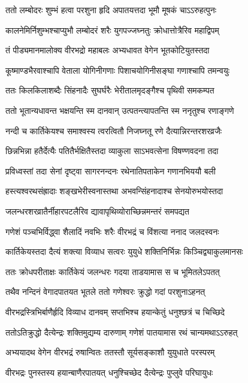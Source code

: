\twolineshloka
{ततो लम्बोदरः शुम्भं हत्वा परशुना हृदि}
{अपातयत्तदा भूमौ मूषकं चाऽऽरुहत्पुनः} %

\twolineshloka
{कालनेमिर्निशुम्भश्चाप्युभौ लम्बोदरं शरैः}
{युगपज्जघ्नतुः क्रोधात्तोत्रैरिव महाद्विपम्} %

\twolineshloka
{तं पीड्यमानमालोक्य वीरभद्रो महाबलः}
{अभ्यधावत वेगेन भूतकोटियुतस्तदा} %

\twolineshloka
{कूष्माण्डभैरवाश्चापि वेताला योगिनीगणाः}
{पिशाचयोगिनीसङ्घा गणाश्चापि तमन्वयुः} %

\twolineshloka
{ततः किलकिलाशब्दैः सिंहनादैः सुघर्घरैः}
{भेरीतालमृदङ्गैश्च पृथिवी समकम्पत} %

\twolineshloka
{ततो भूतान्यधावन्त भक्षयन्ति स्म दानवान्}
{उत्पतन्त्यापतन्ति स्म ननृतुश्च रणाङ्गणे} %

\twolineshloka
{नन्दी च कार्तिकेयश्च समाश्वस्य त्वरत्वितौ}
{निजघ्नतू रणे दैत्यान्निरन्तरशरव्रजैः} %

\twolineshloka
{छिन्नभिन्ना हतैर्देत्यैः पतितैर्भक्षितैस्तदा}
{व्याकुला साऽभवत्सेना विषण्णवदना तदा} %

\twolineshloka
{प्रविध्वस्तां तदा सेनां दृष्ट्वा सागरनन्दनः}
{रथेनातिपताकेन गणानभिययौ बली} %

\twolineshloka
{हस्त्यश्वरथसंह्रादाः शङ्खभेरीस्वनास्तथा}
{अभवन्सिंहनादाश्च सेनयोरुभयोस्तदा} %

\twolineshloka
{जलन्धरशरव्रातैर्नीहारपटलैरिव}
{द्यावापृथिव्योराच्छिन्नमन्तरं समपद्यत} %

\twolineshloka
{गणेशं पञ्चभिर्विद्ध्वा शैलादिं नवभिः शरैः}
{वीरभद्रं च विंशत्या ननाद जलदस्वनः} %

\twolineshloka
{कार्तिकेयस्तदा दैत्यं शक्त्या विव्याध सत्वरः}
{युयुधे शक्तिनिर्भिन्नः किञ्चिद्व्याकुलमानसः} %

\twolineshloka
{ततः क्रोधपरीताक्षः कार्तिकेयं जलन्धरः}
{गदया ताडयामास स च भूमितलेऽपतत्} %

\twolineshloka
{तथैव नन्दिनं वेगादपातयत भूतले}
{ततो गणेश्वरः क्रुद्धो गदां परशुनाऽहनत्} %

\twolineshloka
{वीरभद्रस्त्रिभिर्बाणैर्हृदि विव्याध दानवम्}
{सप्तभिश्च हयान्केतुं धनुश्छत्रं च चिच्छिदे} %

\twolineshloka
{ततोऽतिक्रुद्धो दैत्येन्द्रः शक्तिमुद्यम्य दारुणाम्}
{गणेशं पातयामास रथं चान्यमथाऽऽरुहत्} %

\twolineshloka
{अभ्ययादथ वेगेन वीरभद्रं रुषान्वितः}
{ततस्तौ सूर्यसङ्काशौ युयुधाते परस्परम्} %

\twolineshloka
{वीरभद्रः पुनस्तस्य हयान्बाणैरपातयत्}
{धनुश्चिच्छेद दैत्येन्द्रः पुप्लुवे परिघायुधः} %

